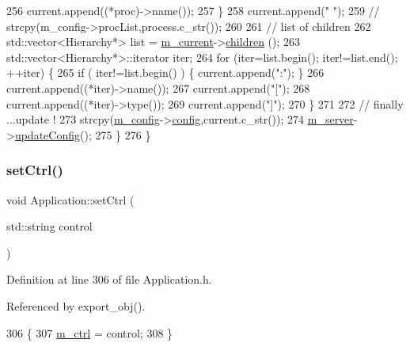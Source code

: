 \begin{DoxyCode}
256       current.append((*proc)->name());
257     \}
258     current.append(\textcolor{stringliteral}{" "});
259     \textcolor{comment}{//    strcpy(m\_config->procList,process.c\_str());}
260 
261     \textcolor{comment}{// list of children}
262     std::vector<Hierarchy*> list = \hyperlink{classApplication_ab0fd877a3c66c41b22109863e1719ccd}{m\_current}->\hyperlink{classHierarchy_aa9a76f69e98e052ee1a6e32cea006288}{children} ();
263     std::vector<Hierarchy*>::iterator iter;
264     \textcolor{keywordflow}{for} (iter=list.begin(); iter!=list.end(); ++iter) \{
265       \textcolor{keywordflow}{if} ( iter!=list.begin() ) \{ current.append(\textcolor{stringliteral}{":"}); \}
266       current.append((*iter)->name());
267       current.append(\textcolor{stringliteral}{"["});
268       current.append((*iter)->type());
269       current.append(\textcolor{stringliteral}{"]"});
270     \}
271 
272     \textcolor{comment}{// finally ...update !}
273     strcpy(\hyperlink{classApplication_ae05f3e253ea871a194c3d30fd1d3b0c3}{m\_config}->\hyperlink{classConfig_a4f977190294b342f444cacd04f0e909b}{config},current.c\_str());
274     \hyperlink{classApplication_a5e6085b0f322d5036177b16113a75b56}{m\_server}->\hyperlink{classServer_af58d60a5587813e2aab7fc9016dfa01a}{updateConfig}();
275   \}
276 \}
\end{DoxyCode}
\mbox{\label{classApplication_a451a04a80f59a76fb13b6fae6c07439a}} 
\subsubsection{\texorpdfstring{set\+Ctrl()}{setCtrl()}}
{\footnotesize\ttfamily void Application\+::set\+Ctrl (\begin{DoxyParamCaption}\item[{std\+::string}]{control }\end{DoxyParamCaption})\hspace{0.3cm}{\ttfamily [inline]}}



Definition at line 306 of file Application.\+h.



Referenced by export\+\_\+obj().


\begin{DoxyCode}
306                                    \{
307     \hyperlink{classApplication_aa371ed989ed34038df400c4d1b41b37f}{m\_ctrl} = control;
308   \}
\end{DoxyCode}
\mbox{\label{classApplication_a0f0a9e376d9f1716e01e86c94ae3499f}} 
